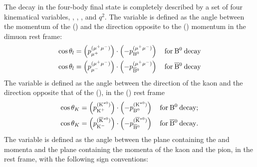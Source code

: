 The decay in the four-body final state is completely described by a set of four kinematical variables, \TL, \TK, \PHI, and $q^2$.
The variable \TL is defined as the angle between the momentum of the \Pgmp (\Pgmm) and the direction opposite to the \PBz (\PaBz) momentum in the dimuon rest frame:
\begin{equation} \label{eq:TLdef}
  \begin{aligned}
    \cos\theta_l & = \left( p_{\mu^{+}}^{(\mu^{+}\mu^{-})} \right) \cdot \left( -p_{{\textrm{B}}{}^{0} }^{(\mu^{+}\mu^{-})} \right)\, && \mathrm{for}\:{\textrm{B}}{}^{0}\:\mathrm{decay} \\
    \cos\theta_l & = \left( p_{\mu^{-}}^{(\mu^{+}\mu^{-})} \right) \cdot \left( -p_{\overline{\textrm{B}}{}^{0}}^{(\mu^{+}\mu^{-})} \right)\, && \mathrm{for}\:\overline{\textrm{B}}{}^{0}\:\mathrm{decay} \\
  \end{aligned}
\end{equation}
The variable \TK is defined as the angle between the direction of the kaon and the direction opposite that of the \PBz (\PaBz), in the \cPKstz (\cPAKstz) rest frame
\begin{equation} \label{eq:TKdef}
  \begin{aligned}
    \cos\theta_K&=\left( p_{\textrm{K}^{+}}^{(\textrm{K}^{\ast0}) } \right) \cdot \left( -p_{{\textrm{B}}{}^{0} }^{(\textrm{K}^{\ast0}) } \right)\, && \mathrm{for}\:{\textrm{B}}{}^{0}\:\mathrm{decay;} \\
    \cos\theta_K&=\left( p_{\textrm{K}^{-}}^{(\overline{\textrm{K}}{}^{\ast0})} \right) \cdot \left( -p_{\overline{\textrm{B}}{}^{0}}^{(\overline{\textrm{K}}{}^{\ast0})} \right)\, && \mathrm{for}\:\overline{\textrm{B}}{}^{0}\:\mathrm{decay.}
  \end{aligned}
\end{equation}
The variable \PHI is defined as the angle between the plane containing the \Pgmp and \Pgmm momenta and the plane containing the momenta of the kaon and the pion, in the \PBz rest frame, with the following sign conventions:
